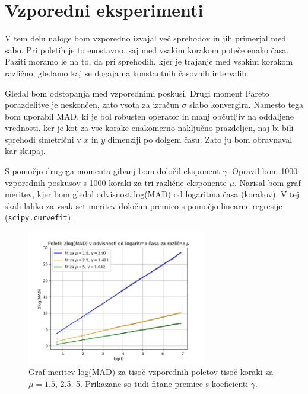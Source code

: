 \documentclass[a4paper, 12pt, slovene]{article}
\begin{document}
\section{Vzporedni eksperimenti}
V tem delu naloge bom vzporedno izvajal več sprehodov in jih primerjal med sabo. Pri poletih je to enostavno, saj med vsakim korakom poteče enako časa. Paziti moramo le na to, da pri sprehodih, kjer je trajanje med vsakim korakom različno, gledamo kaj se dogaja na konstantnih časovnih intervalih.	\par\vspace{5mm}

Gledal bom odstopanja med vzporednimi poskusi. Drugi moment Pareto porazdelitve je neskončen, zato vsota za izračun $\sigma$ slabo konvergira. Namesto tega bom uporabil MAD, ki je bol robusten operator in manj občutljiv na oddaljene vrednosti. ker je kot za vse korake enakomerno naključno prazdeljen, naj bi bili sprehodi simetrični v $x$ in $y$ dimenziji po dolgem času. Zato ju bom obravnaval kar skupaj.\par\vspace{5mm}

S pomočjo drugega momenta gibanj bom določil eksponent $\gamma$. Opravil bom 1000 vzporednih poskusov s 1000 koraki za tri različne eksponente $\mu$. Narisal bom graf meritev, kjer bom gledal odvisnost log(MAD) od logaritma časa (korakov). V tej skali lahko za vsak set meritev določim premico s pomočjo linearne regresije (\texttt{scipy.curvefit}).

\begin{figure}[H]
\centering
\includegraphics[width=0.7\textwidth]{grafi/polet-1000-1000.png}
\caption{Graf meritev log(MAD) za tisoč vzporednih poletov tisoč koraki za $\mu = 1.5$, 2.5, 5. Prikazane so tudi fitane premice s koeficienti $\gamma$.}
\label{fig-poleti-gamma}
\end{figure} 
\end{document}
